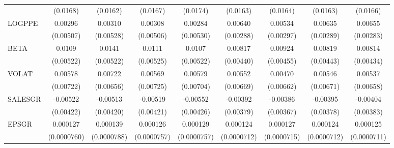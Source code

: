 {\begin{tabular}{l*{8}{c}}
                    &    (0.0168)         &    (0.0162)         &    (0.0167)         &    (0.0174)         &    (0.0163)         &    (0.0164)         &    (0.0163)         &    (0.0166)         \\
LOGPPE              &     0.00296         &     0.00310         &     0.00308         &     0.00284         &     0.00640\sym{**} &     0.00534\sym{*}  &     0.00635\sym{**} &     0.00655\sym{**} \\
                    &   (0.00507)         &   (0.00528)         &   (0.00506)         &   (0.00530)         &   (0.00288)         &   (0.00297)         &   (0.00289)         &   (0.00283)         \\
BETA                &      0.0109\sym{**} &      0.0141\sym{***}&      0.0111\sym{**} &      0.0107\sym{**} &     0.00817\sym{*}  &     0.00924\sym{**} &     0.00819\sym{*}  &     0.00814\sym{*}  \\
                    &   (0.00522)         &   (0.00522)         &   (0.00525)         &   (0.00522)         &   (0.00440)         &   (0.00455)         &   (0.00443)         &   (0.00434)         \\
VOLAT               &     0.00578         &     0.00722         &     0.00569         &     0.00579         &     0.00552         &     0.00470         &     0.00546         &     0.00537         \\
                    &   (0.00722)         &   (0.00656)         &   (0.00725)         &   (0.00704)         &   (0.00669)         &   (0.00662)         &   (0.00671)         &   (0.00658)         \\
SALESGR             &    -0.00522         &    -0.00513         &    -0.00519         &    -0.00552         &    -0.00392         &    -0.00386         &    -0.00395         &    -0.00404         \\
                    &   (0.00422)         &   (0.00420)         &   (0.00421)         &   (0.00426)         &   (0.00379)         &   (0.00367)         &   (0.00378)         &   (0.00383)         \\
EPSGR               &    0.000127\sym{*}  &    0.000139\sym{*}  &    0.000126         &    0.000129\sym{*}  &    0.000124\sym{*}  &    0.000127\sym{*}  &    0.000124\sym{*}  &    0.000125\sym{*}  \\
                    & (0.0000760)         & (0.0000788)         & (0.0000757)         & (0.0000757)         & (0.0000712)         & (0.0000715)         & (0.0000712)         & (0.0000711)         \\

\end{tabular}}
